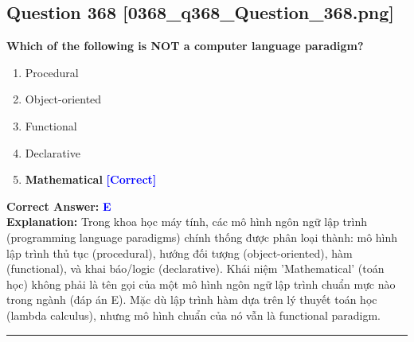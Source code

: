 \documentclass[11pt,a4paper]{article}
\begin{document}
\begin{minipage}{\textwidth}
\subsection*{Question 368 \quad \footnotesize{[0368\_q368\_Question\_368.png]}}
\noindent \textbf{Which of the following is NOT a computer language paradigm?}

\begin{enumerate}[label=\Alph*.]
    \item Procedural
    \item Object-oriented
    \item Functional
    \item Declarative
    \item \textbf{Mathematical} \hfill \textcolor{blue}{\textbf{[Correct]}}
\end{enumerate}

\noindent \textbf{Correct Answer:} \textcolor{blue}{\textbf{E}} \\[2pt]
\noindent \textbf{Explanation:} Trong khoa học máy tính, các mô hình ngôn ngữ lập trình (programming language paradigms) chính thống được phân loại thành: mô hình lập trình thủ tục (procedural), hướng đối tượng (object-oriented), hàm (functional), và khai báo/logic (declarative). Khái niệm 'Mathematical' (toán học) không phải là tên gọi của một mô hình ngôn ngữ lập trình chuẩn mực nào trong ngành (đáp án E). Mặc dù lập trình hàm dựa trên lý thuyết toán học (lambda calculus), nhưng mô hình chuẩn của nó vẫn là functional paradigm.

\par\vspace{0.3cm}
\hrule
\vspace{0.3cm}
\end{minipage}
\end{document}
